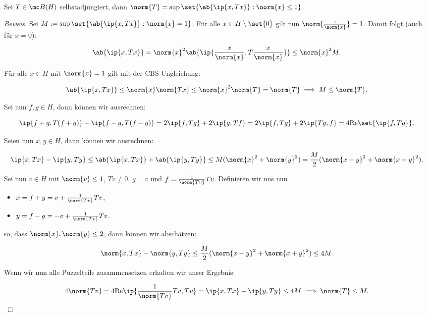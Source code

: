 \begin{theorem}
	
	Sei $T \in \mc B(H)$ selbstadjungiert, dann $\norm{T} = \sup{\set{\ab{\ip{x, Tx}}: \norm{x} \leq 1}}$.
	
	\begin{proof}[Beweis]
		
		Sei $M := \sup{\set{\ab{\ip{x, Tx}}: \norm{x} = 1}}$. Für alle $x \in H \setminus \set{0}$ gilt nun $\norm{\frac{x}{\norm{x}}} = 1$. Damit folgt (auch für $x = 0$):
		
		\[ \ab{\ip{x, Tx}} = \norm{x}^2 \ab{\ip{\frac{x}{\norm{x}}, T \frac{x}{\norm{x}}}} \leq \norm{x}^2 M. \]
		
		
		Für alle $x \in H$ mit $\norm{x} = 1$ gilt mit der CBS-Ungleichung:
		
		\[ \ab{\ip{x, Tx}} \leq \norm{x} \norm{Tx} \leq \norm{x}^2 \norm{T} = \norm{T} \implies M \leq \norm{T}. \]
		
		Sei nun $f, g \in H$, dann können wir ausrechnen:
		
		\[ \ip{f+g, T(f+g)} - \ip{f-g, T(f-g)} = 2\ip{f, Tg} + 2\ip{g, Tf} = 2 \ip{f, Tg} + 2 \ip{Tg, f} = 4 \text{Re}\set{\ip{f, Tg}}. \]
		
		Seien nun $x, y \in H$, dann können wir ausrechnen:
		
		\[ \ip{x, Tx} - \ip{y, Ty} \leq \ab{\ip{x, Tx}} + \ab{\ip{y, Ty}} \leq M (\norm{x}^2 + \norm{y}^2) = \frac{M}{2} (\norm{x-y}^2 + \norm{x+y}^2). \]
		
		Sei nun $v \in H$ mit $\norm{v} \leq 1$, $Tv \not= 0$, $g = v$ und $f = \frac{1}{\norm{Tv}}Tv$. Definieren wir uns nun
		
		\begin{itemize}
			
			\item $x = f+g = v + \frac{1}{\norm{Tv}}Tv$,
			
			\item $y = f-g = -v + \frac{1}{\norm{Tv}}Tv$.
			
		\end{itemize}
		
		so, dass $\norm{x}, \norm{y} \leq 2$, dann können wir abschätzen:
		
		\[ \norm{x, Tx} - \norm{y, Ty} \leq \frac{M}{2} (\norm{x-y}^2 + \norm{x+y}^2) \le 4M. \]
		
		Wenn wir nun alle Puzzelteile zusammensetzen erhalten wir unser Ergebnis:
		
		\[ 4 \norm{Tv} = 4 \text{Re}\ip{\frac{1}{\norm{Tv}}Tv, Tv} = \ip{x, Tx} - \ip{y, Ty} \leq 4M \implies \norm{T} \leq M. \]
		
	\end{proof}
	
\end{theorem}


